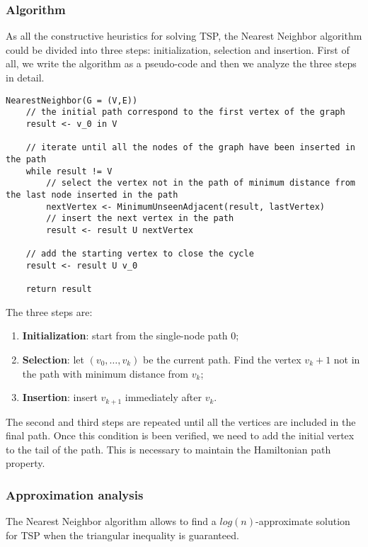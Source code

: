 \subsubsection{Algorithm}
As all the constructive heuristics for solving TSP, the Nearest Neighbor algorithm could be divided into three steps: initialization, selection and insertion. First of all, we write the algorithm as a pseudo-code and then we analyze the three steps in detail.

\begin{verbatim}
NearestNeighbor(G = (V,E))
    // the initial path correspond to the first vertex of the graph
    result <- v_0 in V
    
    // iterate until all the nodes of the graph have been inserted in the path
    while result != V
        // select the vertex not in the path of minimum distance from the last node inserted in the path
        nextVertex <- MinimumUnseenAdjacent(result, lastVertex)
        // insert the next vertex in the path
        result <- result U nextVertex
    
    // add the starting vertex to close the cycle
    result <- result U v_0
    
    return result
\end{verbatim}

The three steps are:
\begin{enumerate}
    \item \textbf{Initialization}: start from the single-node path 0;
    \item \textbf{Selection}: let $(v_0, \dots, v_k)$ be the current path. Find the vertex $v_k+1$ not in the path with minimum distance from $v_k$;
    \item \textbf{Insertion}: insert $v_{k+1}$ immediately after $v_k$.
\end{enumerate}
The second and third steps are repeated until all the vertices are included in the final path. Once this condition is been verified, we need to add the initial vertex to the tail of the path. This is necessary to maintain the Hamiltonian path property.

\subsubsection{Approximation analysis}
The Nearest Neighbor algorithm allows to find a $log(n)$-approximate solution for TSP when the triangular inequality is guaranteed.

